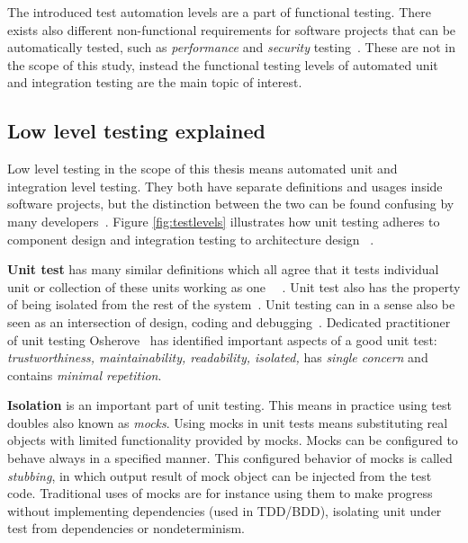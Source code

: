     The introduced test automation levels are a part of functional testing. There exists also different non-functional
    requirements for software projects that can be automatically tested, such as \textit{performance} and \textit{security} testing~\cite{crispin2009agile}.
    These are not in the scope of this study, instead the functional testing levels of automated unit and integration testing are
    the main topic of interest.

    \subsection{Low level testing explained}
    Low level testing in the scope of this thesis means automated unit and integration level testing. They both have separate
    definitions and usages inside software projects, but the distinction between the two can be found confusing by many developers~\cite{artofunit2013}.
    Figure \ref{fig:testlevels} illustrates how unit testing adheres to component design and integration testing to architecture design ~\cite{itkonen2016}.

    \textbf{Unit test} has many similar definitions which all agree that it tests individual unit or collection of these units working as one
    ~\cite{runeson2006survey}~\cite{whittaker2000software}. Unit test also has the property of being isolated from the rest
    of the system~\cite{whittaker2000software}. Unit testing can in a sense also be seen as an intersection of design,
    coding and debugging~\cite{langr2015pragmatic}.
    Dedicated practitioner of unit testing Osherove~\cite{artofunit2013} has identified important aspects of a good unit test:
    \textit{trustworthiness, maintainability, readability, isolated,} has \textit{single concern} and contains \textit{minimal repetition}.

    \textbf{Isolation} is an important part of unit testing. This means in practice using test doubles also known as \textit{mocks}.
    Using mocks in unit tests means substituting real objects with limited functionality provided by mocks. Mocks can be
    configured to behave always in a specified manner. This configured behavior of mocks is called \textit{stubbing},
    in which output result of mock object can be injected from the test code. Traditional uses of mocks are for instance using
    them to make progress without implementing dependencies (used in TDD/BDD), isolating unit under test from dependencies
    or nondeterminism. ~\cite{chelimsky2010rspec}

